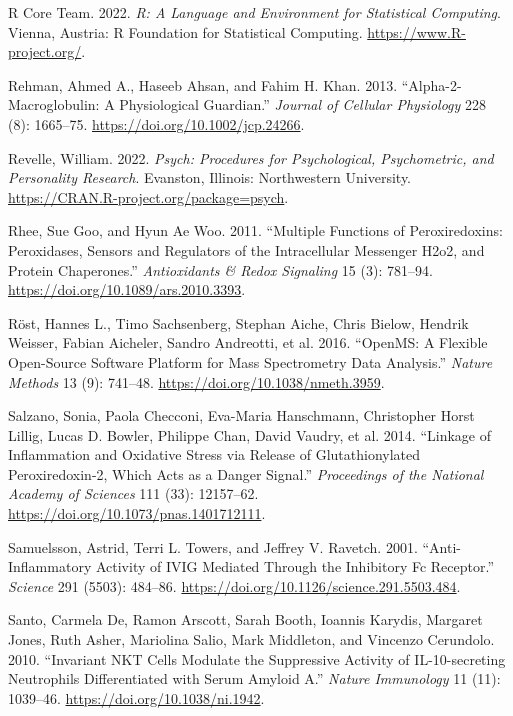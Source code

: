 \documentclass[9pt,lineno]{elife}
\newlength{\cslhangindent}
\newlength{\cslentryspacingunit} %
\newenvironment{CSLReferences}[2] %
 {%
  \setlength{\parindent}{0pt}
  \ifodd #1
  \let\oldpar\par
  \def\par{\hangindent=\cslhangindent\oldpar}
  \fi
  \setlength{\parskip}{#2\cslentryspacingunit}
 }%
 {}
\begin{document}
\begin{CSLReferences}{1}{0}
\leavevmode{}%
R Core Team. 2022. \emph{R: A Language and Environment for Statistical Computing}. Vienna, Austria: R Foundation for Statistical Computing. \url{https://www.R-project.org/}.

\leavevmode{}%
Rehman, Ahmed A., Haseeb Ahsan, and Fahim H. Khan. 2013. {``Alpha-2-Macroglobulin: {A} Physiological Guardian.''} \emph{Journal of Cellular Physiology} 228 (8): 1665--75. \url{https://doi.org/10.1002/jcp.24266}.

\leavevmode{}%
Revelle, William. 2022. \emph{Psych: Procedures for Psychological, Psychometric, and Personality Research}. Evanston, Illinois: Northwestern University. \url{https://CRAN.R-project.org/package=psych}.

\leavevmode{}%
Rhee, Sue Goo, and Hyun Ae Woo. 2011. {``Multiple {Functions} of {Peroxiredoxins}: {Peroxidases}, {Sensors} and {Regulators} of the {Intracellular Messenger H2o2}, and {Protein Chaperones}.''} \emph{Antioxidants \& Redox Signaling} 15 (3): 781--94. \url{https://doi.org/10.1089/ars.2010.3393}.

\leavevmode{}%
Röst, Hannes L., Timo Sachsenberg, Stephan Aiche, Chris Bielow, Hendrik Weisser, Fabian Aicheler, Sandro Andreotti, et al. 2016. {``{OpenMS}: A Flexible Open-Source Software Platform for Mass Spectrometry Data Analysis.''} \emph{Nature Methods} 13 (9): 741--48. \url{https://doi.org/10.1038/nmeth.3959}.

\leavevmode{}%
Salzano, Sonia, Paola Checconi, Eva-Maria Hanschmann, Christopher Horst Lillig, Lucas D. Bowler, Philippe Chan, David Vaudry, et al. 2014. {``Linkage of Inflammation and Oxidative Stress via Release of Glutathionylated Peroxiredoxin-2, Which Acts as a Danger Signal.''} \emph{Proceedings of the National Academy of Sciences} 111 (33): 12157--62. \url{https://doi.org/10.1073/pnas.1401712111}.

\leavevmode{}%
Samuelsson, Astrid, Terri L. Towers, and Jeffrey V. Ravetch. 2001. {``Anti-Inflammatory {Activity} of {IVIG Mediated Through} the {Inhibitory Fc Receptor}.''} \emph{Science} 291 (5503): 484--86. \url{https://doi.org/10.1126/science.291.5503.484}.

\leavevmode{}%
Santo, Carmela De, Ramon Arscott, Sarah Booth, Ioannis Karydis, Margaret Jones, Ruth Asher, Mariolina Salio, Mark Middleton, and Vincenzo Cerundolo. 2010. {``Invariant {NKT} Cells Modulate the Suppressive Activity of {IL-10-secreting} Neutrophils Differentiated with Serum Amyloid {A}.''} \emph{Nature Immunology} 11 (11): 1039--46. \url{https://doi.org/10.1038/ni.1942}.


\end{CSLReferences}
\end{document}
